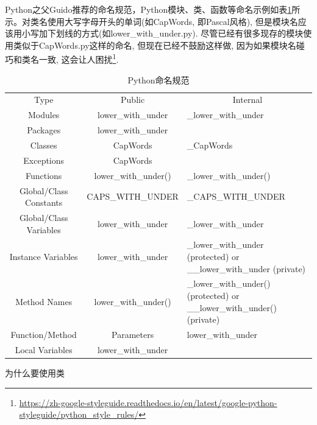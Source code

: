 \documentclass[8pt]{book}
\makeatletter
\numberwithin{dummy}{section}
\theoremstyle{ocrenumbox}
\theoremstyle{blacknumex}
\theoremstyle{blacknumbox}
\theoremstyle{ocrenum}
\renewcommand{\subsection}{\@startsection {subsection}{2}{\z@}
	{-3ex \@plus -0.1ex \@minus -.4ex}
	{0.5ex \@plus.2ex }
	{\normalfont\sffamily\bfseries}}
\makeatother
\begin{document}
Python之父Guido推荐的命名规范，Python模块、类、函数等命名示例如表\ref{table:pythonnamingspecification}所示。对类名使用大写字母开头的单词(如CapWords, 即Pascal风格), 但是模块名应该用小写加下划线的方式(如lower\_with\_under.py). 尽管已经有很多现存的模块使用类似于CapWords.py这样的命名, 但现在已经不鼓励这样做, 因为如果模块名碰巧和类名一致, 这会让人困扰\footnote{\url{https://zh-google-styleguide.readthedocs.io/en/latest/google-python-styleguide/python_style_rules/}}.


\begin{table}[htbp]
	\caption{Python命名规范}
	\label{table:pythonnamingspecification}
	\begin{center}
		\begin{tabular}{|c|c|p{5cm}|}
			\hline
			\multirow{1}{*}{Type}
			& \multicolumn{1}{c|}{Public} 
			& \multicolumn{1}{c|}{Internal}\\			
			\cline{1-3}
			Modules &  lower\_with\_under	  & \_lower\_with\_under \\
			\hline
			Packages & lower\_with\_under &   \\
			\hline
			Classes & CapWords & \_CapWords \\
			\hline
			Exceptions & CapWords & \\
			\hline
			Functions &	lower\_with\_under() &	\_lower\_with\_under()\\
			\hline 
			Global/Class Constants &	CAPS\_WITH\_UNDER &\_CAPS\_WITH\_UNDER\\
			\hline
			Global/Class Variables &	lower\_with\_under &	\_lower\_with\_under\\
			\hline
			Instance Variables &	lower\_with\_under &	\_lower\_with\_under (protected) or \_\_lower\_with\_under (private)\\
			\hline
			Method Names &	lower\_with\_under() &	\_lower\_with\_under() (protected) or \_\_lower\_with\_under() (private)\\
			\hline
			Function/Method & Parameters &	lower\_with\_under\\
			\hline	 
			Local Variables &	lower\_with\_under	& \\
			\hline							
		\end{tabular}	
	\end{center}
\end{table}

\subsection{为什么要使用类}
\end{document}
